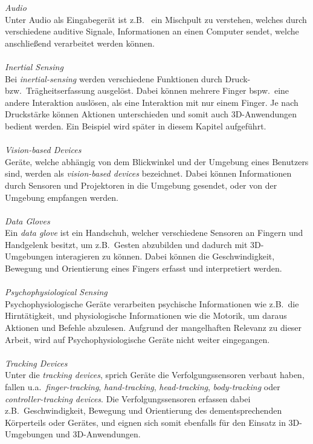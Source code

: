 \noindent \textit{Audio}\\
Unter Audio als Eingabegerät ist z.B.~ ein Mischpult zu verstehen, welches durch verschiedene auditive Signale, Informationen an einen Computer sendet, welche anschließend verarbeitet werden können.\\
\\
\noindent \textit{Inertial Sensing}\\
Bei \textit{inertial-sensing} werden verschiedene Funktionen durch Druck- bzw.~Trägheitserfassung ausgelöst. Dabei können mehrere Finger bspw.~eine andere Interaktion auslösen, als eine Interaktion mit nur einem Finger. Je nach Druckstärke können Aktionen unterschieden und somit auch 3D-Anwendungen bedient werden. Ein Beispiel wird später in diesem Kapitel aufgeführt.\\
\\
\noindent \textit{Vision-based Devices}\\
Geräte, welche abhängig von dem Blickwinkel und der Umgebung eines Benutzers sind, werden als \textit{vision-based devices} bezeichnet. Dabei können Informationen durch Sensoren und Projektoren in die Umgebung gesendet, oder von der Umgebung empfangen werden.\\
\\
\noindent \textit{Data Gloves}\\
Ein \textit{data glove} ist ein Handschuh, welcher verschiedene Sensoren an Fingern und Handgelenk besitzt, um z.B.~Gesten abzubilden und dadurch mit 3D-Umgebungen interagieren zu können. Dabei können die Geschwindigkeit, Bewegung und Orientierung eines Fingers erfasst und interpretiert werden.\\
\\
\noindent \textit{Psychophysiological Sensing}\\
Psychophysiologische Geräte verarbeiten psychische Informationen wie z.B.~die Hirntätigkeit, und physiologische Informationen wie die Motorik, um daraus Aktionen und Befehle abzulesen. Aufgrund der mangelhaften Relevanz zu dieser Arbeit, wird auf Psychophysiologische Geräte nicht weiter eingegangen.\\
\\
\noindent \textit{Tracking Devices}\\
Unter die \textit{tracking devices}, sprich Geräte die Verfolgungssensoren verbaut haben, fallen u.a.~\textit{finger-tracking}, \textit{hand-tracking}, \textit{head-tracking}, \textit{body-tracking} oder \textit{controller-tracking devices}. Die Verfolgungssensoren erfassen dabei z.B.~Geschwindigkeit, Bewegung und Orientierung des dementsprechenden Körperteils oder Gerätes, und eignen sich somit ebenfalls für den Einsatz in 3D-Umgebungen und 3D-Anwendungen.\\
